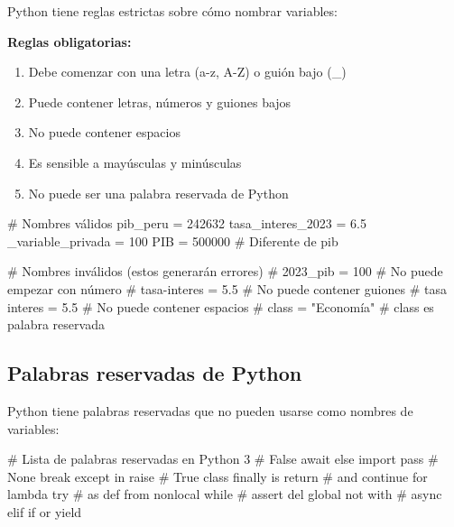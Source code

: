 \documentclass[
  doc,
  floatsintext,
  longtable,
  a4paper,
  nolmodern,
  notxfonts,
  notimes,
  12pt,
  colorlinks=true,linkcolor=blue,citecolor=blue,urlcolor=blue]{apa7}
\newenvironment{Shaded}{\begin{snugshade}}{\end{snugshade}}
\newcommand{\CommentTok}[1]{\textcolor[rgb]{0.37,0.37,0.37}{#1}}
\newcommand{\DecValTok}[1]{\textcolor[rgb]{0.68,0.00,0.00}{#1}}
\newcommand{\FloatTok}[1]{\textcolor[rgb]{0.68,0.00,0.00}{#1}}
\newcommand{\NormalTok}[1]{\textcolor[rgb]{0.00,0.23,0.31}{#1}}
\newcommand{\OperatorTok}[1]{\textcolor[rgb]{0.37,0.37,0.37}{#1}}
\providecommand{\tightlist}{%
  \setlength{\itemsep}{0pt}\setlength{\parskip}{0pt}}
\begin{document}
Python tiene reglas estrictas sobre cómo nombrar variables:

\textbf{Reglas obligatorias:}

\begin{enumerate}
\def\labelenumi{\arabic{enumi}.}
\tightlist
\item
  Debe comenzar con una letra (a-z, A-Z) o guión bajo (\_)
\item
  Puede contener letras, números y guiones bajos
\item
  No puede contener espacios
\item
  Es sensible a mayúsculas y minúsculas
\item
  No puede ser una palabra reservada de Python
\end{enumerate}

\begin{Shaded}
\begin{Highlighting}[]
\CommentTok{\# Nombres válidos}
\NormalTok{pib\_peru }\OperatorTok{=} \DecValTok{242632}
\NormalTok{tasa\_interes\_2023 }\OperatorTok{=} \FloatTok{6.5}
\NormalTok{\_variable\_privada }\OperatorTok{=} \DecValTok{100}
\NormalTok{PIB }\OperatorTok{=} \DecValTok{500000}  \CommentTok{\# Diferente de pib}

\CommentTok{\# Nombres inválidos (estos generarán errores)}
\CommentTok{\# 2023\_pib = 100        \# No puede empezar con número}
\CommentTok{\# tasa{-}interes = 5.5    \# No puede contener guiones}
\CommentTok{\# tasa interes = 5.5    \# No puede contener espacios}
\CommentTok{\# class = "Economía"    \# class es palabra reservada}
\end{Highlighting}
\end{Shaded}

\subsection{Palabras reservadas de
Python}\label{palabras-reservadas-de-python}

Python tiene palabras reservadas que no pueden usarse como nombres de
variables:

\begin{Shaded}
\begin{Highlighting}[]
\CommentTok{\# Lista de palabras reservadas en Python 3}
\CommentTok{\# False      await      else       import     pass}
\CommentTok{\# None       break      except     in         raise}
\CommentTok{\# True       class      finally    is         return}
\CommentTok{\# and        continue   for        lambda     try}
\CommentTok{\# as         def        from       nonlocal   while}
\CommentTok{\# assert     del        global     not        with}
\CommentTok{\# async      elif       if         or         yield}
\end{Highlighting}
\end{Shaded}
\end{document}
